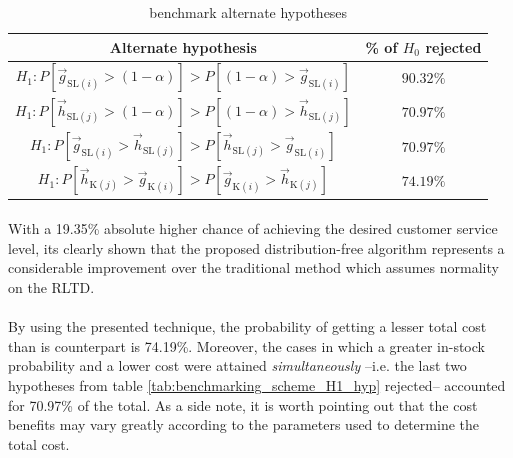 \documentclass[letterpaper]{article}
\begin{document}
\begin{table}[h!]
    \begin{center}
        \begin{tabular}{c|c}
            \toprule
            \textbf{Alternate hypothesis} & \textbf{\% of $H_0$ rejected} \\
            \midrule
            $H_1: P\left[\vec{g}_{\mathrm{SL}(i)}>(1-\alpha)\right] > P\left[(1-\alpha)>\vec{g}_{\mathrm{SL}(i)}\right]$ & $90.32\%$ \\
            \midrule
            $H_1: P\left[\vec{h}_{\mathrm{SL}(j)}>(1-\alpha)\right] > P\left[(1-\alpha)>\vec{h}_{\mathrm{SL}(j)}\right]$ & $70.97\%$ \\
            \midrule
            $H_1: P\left[\vec{g}_{\mathrm{SL}(i)}>\vec{h}_{\mathrm{SL}(j)}\right] > P\left[\vec{h}_{\mathrm{SL}(j)}>\vec{g}_{\mathrm{SL}(i)}\right]$ & $70.97\%$ \\
            \midrule
            $H_1: P\left[\vec{h}_{\mathrm{K}(j)}>\vec{g}_{\mathrm{K}(i)}\right] > P\left[\vec{g}_{\mathrm{K}(i)}>\vec{h}_{\mathrm{K}(j)}\right]$ & $74.19\%$ \\
            \bottomrule
        \end{tabular}
    \end{center}
    \caption{benchmark alternate hypotheses}
    \label{tab:benchmarking_scheme_H1_hyp_r}
\end{table}

\paragraph{}
With a 19.35\% absolute higher chance of achieving the desired customer service level, its clearly shown that the proposed distribution-free algorithm represents a considerable improvement over the traditional method which assumes normality on the RLTD.

\paragraph{}
By using the presented technique, the probability of getting a lesser total cost than is counterpart is 74.19\%. Moreover, the cases in which a greater in-stock probability and a lower cost were attained \textit{simultaneously} --i.e. the last two hypotheses from table \ref{tab:benchmarking_scheme_H1_hyp} rejected-- accounted for 70.97\% of the total. As a side note, it is worth pointing out that the cost benefits may vary greatly according to the parameters used to determine the total cost.
\end{document}
